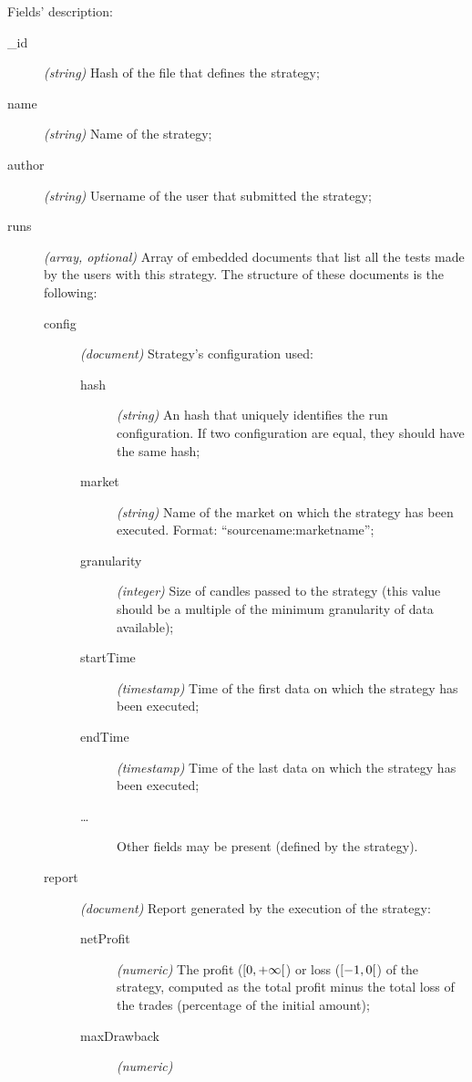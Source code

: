 Fields' description:
\begin{description}
	\item[\_id] \textit{(string)} Hash of the file that defines the
		strategy;
	\item[name] \textit{(string)} Name of the strategy;
	\item[author] \textit{(string)} Username of the user that submitted the
		strategy;
	\item[runs] \textit{(array, optional)} Array of embedded documents that
		list all the tests made by the users with this strategy. The
		structure of these documents is the following:
		\begin{description}
			\item[config] \textit{(document)} Strategy's
				configuration used:
				\begin{description}
					\item[hash] \textit{(string)} An hash
						that uniquely identifies the
						run configuration. If two
						configuration are equal, they
						should have the same hash;
					\item[market] \textit{(string)} Name of
						the market on which the strategy
						has been executed. Format:
						\enquote{sourcename:marketname};
					\item[granularity] \textit{(integer)}
						Size of candles passed to the
						strategy (this value should be a
						multiple of the minimum
						granularity of data available);
					\item[startTime]
						\textit{(timestamp)} Time of the
						first data on which the strategy
						has been executed;
					\item[endTime]
						\textit{(timestamp)} Time of the
						last data on which the strategy
						has been executed;
					\item[\ldots] Other fields may be
						present (defined by the
						strategy).
				\end{description}
			\item[report] \textit{(document)} Report generated by
				the execution of the strategy:
				\begin{description}
					\item[netProfit] \textit{(numeric)} The
						profit (\(\interval[open
						right]{0}{+\infty}\)) or loss
						(\(\interval[open
						right]{-1}{0}\)) of the
						strategy, computed as the total
						profit minus the total loss of
						the trades (percentage of the
						initial amount);
					\item[maxDrawback] \textit{(numeric)}

\end{description}
\end{description}
\end{description}
